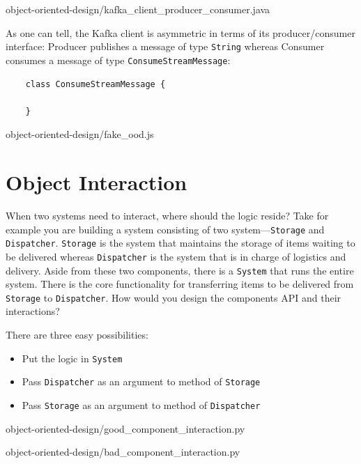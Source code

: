 \documentclass[oneside,11pt]{book}
\theoremstyle{definition}
\theoremstyle{remark}
\newcommand{\code}[1]{\mbox{\lstinline{#1}}}
\begin{document}

{object-oriented-design/kafka_client_producer_consumer.java}

As one can tell, the Kafka client is asymmetric in terms of its producer/consumer interface:
Producer publishes a message of type \code{String} whereas Consumer consumes a message of type
\code{ConsumeStreamMessage}:
\begin{lstlisting}
    class ConsumeStreamMessage {

    }
\end{lstlisting}


{object-oriented-design/fake_ood.js}

\section{Object Interaction}\label{sec:object-interaction}

When two systems need to interact, where should the logic reside?
Take for example you are building a system consisting of two system---\code{Storage} and
\code{Dispatcher}.
\code{Storage} is the system that maintains the storage of items waiting to be delivered whereas
\code{Dispatcher} is the system that is in charge of logistics and delivery.
Aside from these two components, there is a \code{System} that runs the entire system.
There is the core functionality for transferring items to be delivered from \code{Storage} to
\code{Dispatcher}.
How would you design the components API and their interactions?

There are three easy possibilities:
\begin{itemize}
    \item Put the logic in \code{System}
    \item Pass \code{Dispatcher} as an argument to method of \code{Storage}
    \item Pass \code{Storage} as an argument to method of \code{Dispatcher}
\end{itemize}


{object-oriented-design/good_component_interaction.py}


{object-oriented-design/bad_component_interaction.py}
\clearpage{}
    \clearpage{}
\end{document}
